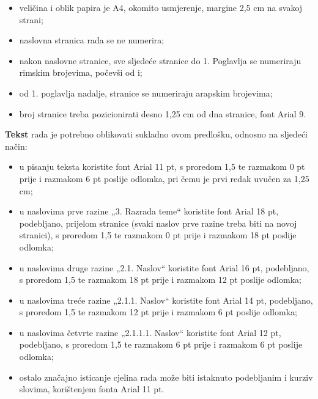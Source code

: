 \documentclass{foi}
\begin{document}
\begin{itemize}
    \item veličina i oblik papira je A4, okomito usmjerenje, margine 2,5 cm na svakoj strani;

    \item naslovna stranica rada se ne numerira;

    \item nakon naslovne stranice, sve sljedeće stranice do 1. Poglavlja se numeriraju rimskim brojevima, počevši od i;

    \item od 1. poglavlja nadalje, stranice se numeriraju arapskim brojevima;

    \item broj stranice treba pozicionirati desno 1,25 cm od dna stranice, font Arial 9.
\end{itemize}
\begin{flushleft}\textbf{Tekst} rada je potrebno oblikovati sukladno ovom predlošku, odnosno na sljedeći način:\end{flushleft}
\begin{itemize}
    \item u pisanju teksta koristite font Arial 11 pt, s proredom 1,5 te razmakom 0 pt prije i razmakom 6 pt poslije odlomka, pri čemu je prvi redak uvučen za 1,25 cm;

    \item u naslovima prve razine „3. Razrada teme“ koristite font Arial 18 pt, podebljano, prijelom stranice (svaki naslov prve razine treba biti na novoj stranici), s proredom 1,5 te razmakom 0 pt prije i razmakom 18 pt poslije odlomka;

    \item u naslovima druge razine „2.1. Naslov“ koristite font Arial 16 pt, podebljano, s proredom 1,5 te razmakom 18 pt prije i razmakom 12 pt poslije odlomka;

    \item u naslovima treće razine „2.1.1. Naslov“ koristite font Arial 14 pt, podebljano, s proredom 1,5 te razmakom 12 pt prije i razmakom 6 pt poslije odlomka;

    \item u naslovima četvrte razine „2.1.1.1. Naslov“ koristite font Arial 12 pt, podebljano, s proredom 1,5 te razmakom 6 pt prije i razmakom 6 pt poslije odlomka;

    \item ostalo značajno isticanje cjelina rada može biti istaknuto podebljanim i kurziv slovima, korištenjem fonta Arial 11 pt.
\end{itemize}
\end{document}
